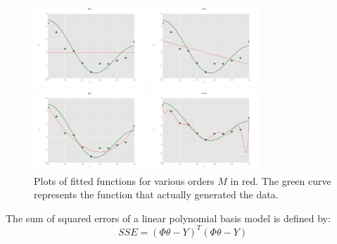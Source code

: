 \documentclass[10pt]{article}
\begin{document}
\begin{figure}[ht]
	\centering
	\begin{minipage}[b]{.24\linewidth}
		\includegraphics[width=1\linewidth, height=1.2in]{figures/M0.png}
		\caption*{$M=0$}
	\end{minipage}
	\begin{minipage}[b]{.24\linewidth}
		\includegraphics[width=1\linewidth, height=1.2in]{figures/M1.png}
			\caption*{$M=1$}
	\end{minipage}
	\begin{minipage}[b]{.24\linewidth}
		\includegraphics[width=1\linewidth, height=1.2in]{figures/M3.png}
		\caption*{$M=3$}
	\end{minipage}
	\begin{minipage}[b]{.24\linewidth}
		\includegraphics[width=1\linewidth, height=1.2in]{figures/M10.png}
		\caption*{$M=10$}
	\end{minipage}
	\caption{Plots of fitted functions for various orders $M$ in red. The green curve represents the function that actually generated the data.} 
\end{figure}


The sum of squared errors of a linear polynomial basis model is defined by: 
\begin{equation*}
	SSE=(\Phi \theta-Y)^T(\Phi \theta-Y)
\end{equation*}
\end{document}
